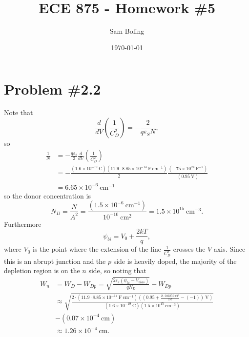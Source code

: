 \documentclass{article}
\title{ECE 875 - Homework \#5}
\author{Sam Boling}
\date{\today}
\begin{document}
\maketitle

\section*{Problem \#2.2}
Note that
$$
\frac{d}{dV} \left(\frac{1}{C_D^2}\right) 
  = -\frac{2}{q \varepsilon_S N },
$$
so
\begin{align*}
\frac{1}{N} &= -\frac{q \varepsilon_s}
                {2}
             \frac{d}{dV}
             \left(\frac{1}{C_D^2}\right) \\ 
  &= -\frac{(1.6 \times 10^{-19} ~\mathrm{C})
           (11.9 \cdot 8.85 \times 10^{-14} ~\mathrm{F}~\mathrm{cm}^{-1})}
          {2}
      \frac{(-75 \times 10^{24} ~\mathrm{F}^{-2})}
           {(0.95 ~\mathrm{V})} \\
  &= 6.65 \times 10^{-6} ~\mathrm{cm}^{-1}
\end{align*}
so the donor concentration is
$$
N_D = \frac{N}{A^2} 
  = \frac{(1.5 \times 10^{-6} ~\mathrm{cm}^{-1})}
         {10^{-10} ~\mathrm{cm}^2}
  = 1.5 \times 10^{15} ~\mathrm{cm}^{-3}.
$$
Furthermore
$$
\psi_{bi} = V_0 + \frac{2 k T}{q},
$$
where $V_0$ is the point where the extension of the line $\frac{1}{C_D^2}$
crosses the $V$ axis. Since this is an abrupt junction and the $p$ side is
heavily doped, the majority of the depletion region is on the $n$ side, so
noting that
\begin{align*}
W_n &= W_D - W_{Dp} = \sqrt{\frac{2 \varepsilon_s (\psi_{bi} - V_{bias})}{q N_D}} - W_{Dp}\\
    &\approx \sqrt{\frac{2 \cdot (11.9 \cdot 8.85 \times 10^{-14} ~\mathrm{F}~\mathrm{cm}^{-1})
                         ((0.95 + \frac{2 \cdot 0.0259 ~\mathrm{eV}}{1 ~\mathrm{e}} - (-1))~\mathrm{V})}
                        {(1.6 \times 10^{-19} ~\mathrm{C})
                         (1.5 \times 10^{15} ~\mathrm{cm}^{-3})}} \\
    &- (0.07 \times 10^{-4} ~\mathrm{cm}) \\
    &\approx 1.26 \times 10^{-4} ~\mathrm{cm}.
\end{align*}
\end{document}
